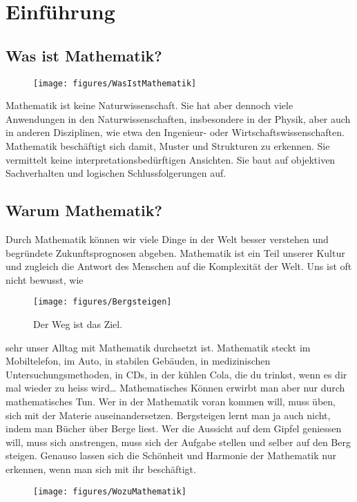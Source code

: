 \chapter{Einführung}

\section{Was ist Mathematik?}
\begin{wrapfigure}{r}{0.45\textwidth}
    \vspace{-.8cm}
	\begin{center}
		\texttt{[image: figures/WasIstMathematik]}
	\end{center}
\end{wrapfigure}
Mathematik ist keine Naturwissenschaft. Sie hat aber dennoch viele Anwendungen in den Naturwissenschaften, insbesondere in der Physik, aber auch in anderen Disziplinen, wie etwa den Ingenieur- oder Wirtschaftswissenschaften.
Mathematik beschäftigt sich damit, Muster und Strukturen zu erkennen. 
Sie vermittelt keine interpretationsbedürftigen Ansichten.
Sie baut auf objektiven Sachverhalten und logischen Schlussfolgerungen auf.\par

\section{Warum Mathematik?}
Durch Mathematik können wir viele Dinge in der Welt besser verstehen und begründete Zukunftsprognosen abgeben.
Mathematik ist ein Teil unserer Kultur und zugleich die Antwort des Menschen auf die Komplexität der Welt.
Uns ist oft nicht bewusst, wie
\begin{wrapfigure}{l}{0.5\textwidth}
    \vspace{-.4cm}
	\begin{center}
		\texttt{[image: figures/Bergsteigen]}
	\end{center}
	\caption{Der Weg ist das Ziel.}
\end{wrapfigure}
sehr unser Alltag mit Mathematik durchsetzt ist.
Mathematik steckt im Mobiltelefon, im Auto, in stabilen Gebäuden, in medizinischen Untersuchungsmethoden, in CDs, in der kühlen Cola, die du trinkst, wenn es dir mal wieder zu heiss wird\ldots
Mathematisches Können erwirbt man aber nur durch mathematisches Tun. Wer in der Mathematik voran kommen will, muss üben, sich mit der Materie auseinandersetzen. Bergsteigen lernt man ja auch nicht, indem man Bücher über Berge liest.
Wer die Aussicht auf dem Gipfel geniessen will, muss sich anstrengen, muss sich der Aufgabe stellen und selber auf den Berg steigen.
Genauso lassen sich die Schönheit und Harmonie der Mathematik nur erkennen, wenn man sich mit ihr beschäftigt.

\begin{figure}
\texttt{[image: figures/WozuMathematik]}
\end{figure}
\thispagestyle{empty}
